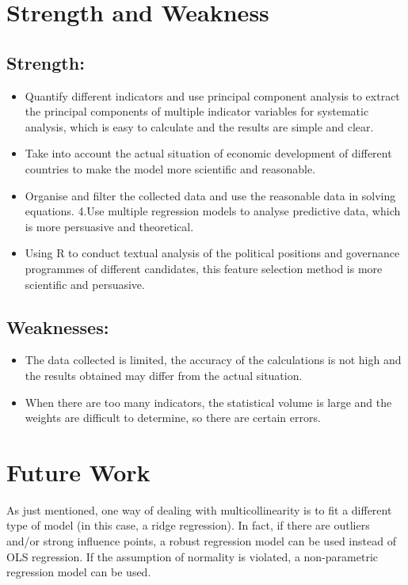 \documentclass{apmcmthesis}
\begin{document}
\section{Strength and Weakness}
\subsection{Strength:}
\begin{itemize}
	\item Quantify different indicators and use principal component analysis to extract the principal components of multiple indicator variables for systematic analysis, which is easy to calculate and the results are simple and clear. 
	\item Take into account the actual situation of economic development of different countries to make the model more scientific and reasonable. 
	\item Organise and filter the collected data and use the reasonable data in solving equations. 
	4.Use multiple regression models to analyse predictive data, which is more persuasive and theoretical. 
	\item Using R to conduct textual analysis of the political positions and governance programmes of different candidates, this feature selection method is more scientific and persuasive.
\end{itemize}
\subsection{Weaknesses:}
\begin{itemize}
	\item The data collected is limited, the accuracy of the calculations is not high and the results obtained may differ from the actual situation. 
	\item When there are too many indicators, the statistical volume is large and the weights are difficult to determine, so there are certain errors.
\end{itemize}


\section{Future Work}

As just mentioned, one way of dealing with multicollinearity is to fit a different type of model (in this case, a ridge regression). In fact, if there are outliers and/or strong influence points, a robust regression model can be used instead of OLS regression. If the assumption of normality is violated, a non-parametric regression model can be used.
\end{document}
